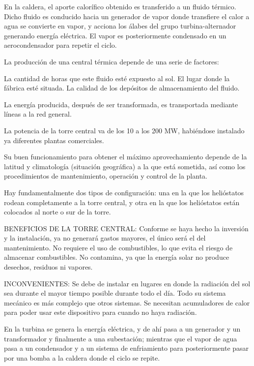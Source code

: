 En la caldera, el aporte calorífico obtenido es transferido a un fluido térmico. Dicho fluido es conducido hacia un generador de vapor donde transfiere el calor a agua se convierte en vapor, y acciona los álabes del grupo turbina-alternador generando energía eléctrica. El vapor es posteriormente condensado en un aerocondensador para repetir el ciclo.

La producción de una central térmica depende de una serie de factores:

La cantidad de horas que este fluido esté expuesto al sol.
El lugar donde la fábrica esté situada.
La calidad de los depósitos de almacenamiento del fluido.

La energía producida, después de ser transformada, es transportada mediante líneas a la red general. \cite{LuciaRinconWebSite}

La potencia de la torre central va de los 10 a los 200 MW, habiéndose instalado ya diferentes plantas comerciales.

Su buen funcionamiento para obtener el máximo aprovechamiento depende de la latitud y climatología (situación geográfica) a la que está sometida, así como los procedimientos de mantenimiento, operación y control de la planta.

Hay fundamentalmente dos tipos de configuración: una en la que los helióstatos rodean completamente a la torre central, y otra en la que los helióstatos están colocados al norte o sur de la torre.

BENEFICIOS DE LA TORRE CENTRAL:
Conforme se haya hecho la inversión y la instalación, ya no generará gastos mayores, el único será el del mantenimiento.
No requiere el uso de combustibles, lo que evita el riesgo de almacenar combustibles.
No contamina, ya que la energía solar no produce desechos, residuos ni vapores.

INCONVENIENTES:
Se debe de instalar en lugares en donde la radiación del sol sea durante el mayor tiempo posible durante todo el día.
Todo su sistema mecánico es más complejo que otros sistemas.
Se necesitan acumuladores de calor para poder usar este dispositivo para cuando no haya radiación.

En la turbina se genera la energía eléctrica, y de ahí pasa a un generador y un transformador y finalmente a una subestación; mientras que el vapor de agua pasa a un condensador y a un sistema de enfriamiento para posteriormente pasar por una bomba a la caldera donde el ciclo se repite. \cite{IgualadaWebSite} \cite{SoliclimaWebSite} \cite{ClaudioWebSite}

